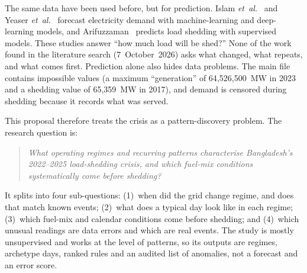 \documentclass[10pt,a4paper]{article}
\begin{document}
The same data have been used before, but for prediction. Islam \emph{et~al.}~\cite{islam2025} and Yeaser \emph{et~al.}~\cite{yeaser2025} forecast electricity demand with machine-learning and deep-learning models, and Arifuzzaman~\cite{arifuzzaman2026} predicts load shedding with supervised models. These studies answer ``how much load will be shed?'' None of the work found in the literature search (7~October~2026) asks what changed, what repeats, and what comes first. Prediction alone also hides data problems. The main file contains impossible values (a maximum ``generation'' of 64{,}526{,}500~MW in 2023 and a shedding value of 65{,}359~MW in 2017), and demand is censored during shedding because it records what was served.

This proposal therefore treats the crisis as a pattern-discovery problem. The research question is:
\begin{quote}
\emph{What operating regimes and recurring patterns characterise Bangladesh's 2022--2025 load-shedding crisis, and which fuel-mix conditions systematically come before shedding?}
\end{quote}
It splits into four sub-questions: (1)~when did the grid change regime, and does that match known events; (2)~what does a typical day look like in each regime; (3)~which fuel-mix and calendar conditions come before shedding; and (4)~which unusual readings are data errors and which are real events. The study is mostly unsupervised and works at the level of patterns, so its outputs are regimes, archetype days, ranked rules and an audited list of anomalies, not a forecast and an error score.

\end{document}
